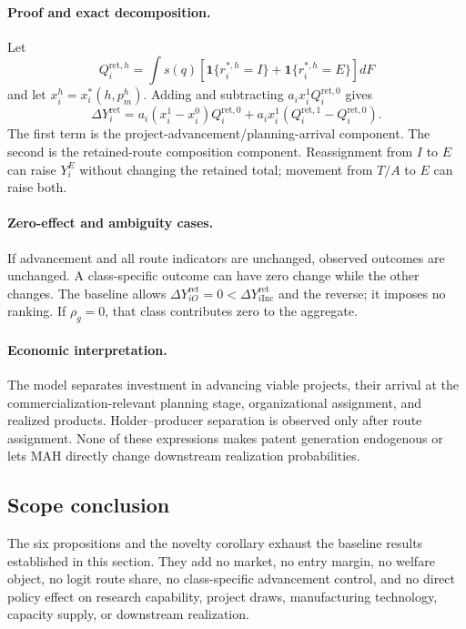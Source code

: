 \paragraph{Proof and exact decomposition.}
Let
\[
  Q_i^{\mathrm{ret},h}
  =
  \int s(q)
  [\mathbf 1\{r_i^{*,h}=I\}+\mathbf 1\{r_i^{*,h}=E\}]
  dF
\]
and let \(x_i^h=x_i^*(h,p_m^h)\). Adding and subtracting
\(a_ix_i^1Q_i^{\mathrm{ret},0}\) gives
\begin{equation}
  \Delta Y_i^{\mathrm{ret}}
  =
  a_i(x_i^1-x_i^0)Q_i^{\mathrm{ret},0}
  +
  a_ix_i^1
  (Q_i^{\mathrm{ret},1}-Q_i^{\mathrm{ret},0}).
  \label{eq:p08-outcome-decomposition}
\end{equation}
The first term is the project-advancement/planning-arrival component. The
second is the retained-route composition component. Reassignment from \(I\)
to \(E\) can raise \(Y_i^E\) without changing the retained total; movement
from \(T/A\) to \(E\) can raise both.

\paragraph{Zero-effect and ambiguity cases.}
If advancement and all route indicators are unchanged, observed outcomes are
unchanged. A class-specific outcome can have zero change while the other
changes. The baseline allows
\(\Delta Y_{iO}^{\mathrm{ret}}=0<
\Delta Y_{i\mathrm{Inc}}^{\mathrm{ret}}\) and the reverse; it imposes no
ranking. If \(\rho_g=0\), that class contributes zero to the aggregate.

\paragraph{Economic interpretation.}
The model separates investment in advancing viable projects, their arrival at
the commercialization-relevant planning stage, organizational assignment, and
realized products. Holder--producer separation is observed only after route
assignment. None of these expressions makes patent generation endogenous or
lets MAH directly change downstream realization probabilities.

\subsection{Scope conclusion}
\label{subsec:p08-scope}

The six propositions and the novelty corollary exhaust the baseline results
established in this section. They add no market, no entry margin, no welfare object, no
logit route share, no class-specific advancement control, and no direct policy
effect on research capability, project draws, manufacturing technology,
capacity supply, or downstream realization.
